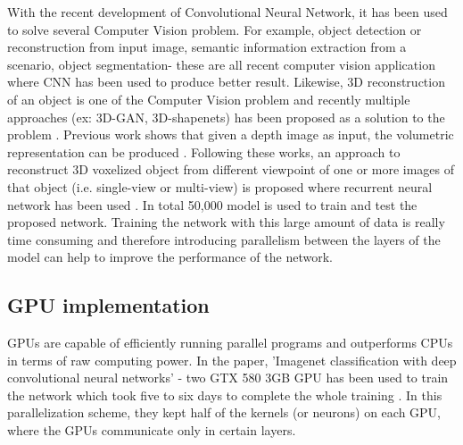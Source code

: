 \documentclass[11pt]{article}       %
\begin{document}
With the recent development of Convolutional Neural Network, it has been used to solve several Computer Vision problem. For example, object detection or reconstruction from input image, semantic information extraction from a scenario, object segmentation- these are all recent computer vision application where CNN has been used to produce better result. Likewise, 3D reconstruction of an object is one of the Computer Vision problem and recently multiple approaches (ex: 3D-GAN, 3D-shapenets) has been proposed as a solution to the problem \cite{dr1}. Previous work shows that given a depth image as input, the volumetric representation can be produced \cite{dr2}. Following these works, an approach to reconstruct 3D voxelized object from different viewpoint of one or more images of that object (i.e. single-view or multi-view) is proposed where recurrent neural network has been used \cite{dr7}. In total 50,000 model is used to train and test the proposed network. Training the network with this large amount of data is really time consuming and therefore introducing parallelism between the layers of the model can help to improve the performance of the network.

\subsection{GPU implementation} \label{GPUimpl}
GPUs are capable of efficiently running parallel programs and outperforms CPUs in terms of raw computing power. In the paper, 'Imagenet classification with deep convolutional neural networks' - two GTX 580 3GB GPU has been used to train the network which took five to six days to complete the whole training \cite{dr5}. In this parallelization scheme, they kept half of the kernels (or neurons) on each GPU, where the GPUs communicate only in certain layers.
\end{document}
